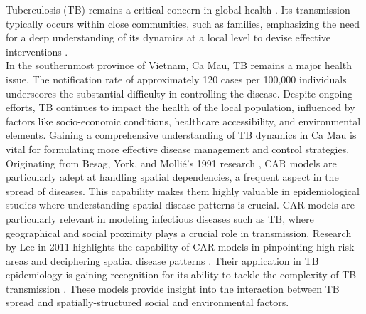 \documentclass[
  number,
  preprint,
  3p]{elsarticle}
\begin{document}
Tuberculosis (TB) remains a critical concern in global health
\citep{villar-hernandez-2023}. Its transmission typically occurs within
close communities, such as families, emphasizing the need for a deep
understanding of its dynamics at a local level to devise effective
interventions \citep{cole-2020}.\\
In the southernmost province of Vietnam, Ca Mau, TB remains a major
health issue. The notification rate of approximately 120 cases per
100,000 individuals underscores the substantial difficulty in
controlling the disease. Despite ongoing efforts, TB continues to impact
the health of the local population, influenced by factors like
socio-economic conditions, healthcare accessibility, and environmental
elements. Gaining a comprehensive understanding of TB dynamics in Ca Mau
is vital for formulating more effective disease management and control
strategies.\\
Originating from Besag, York, and Mollié's 1991 research
\citep{besag-1991}, CAR models are particularly adept at handling
spatial dependencies, a frequent aspect in the spread of diseases. This
capability makes them highly valuable in epidemiological studies where
understanding spatial disease patterns is crucial. CAR models are
particularly relevant in modeling infectious diseases such as TB, where
geographical and social proximity plays a crucial role in transmission.
Research by Lee in 2011 highlights the capability of CAR models in
pinpointing high-risk areas and deciphering spatial disease patterns
\citep{lee-2011}. Their application in TB epidemiology is gaining
recognition for its ability to tackle the complexity of TB transmission
\citep{lima-2019}. These models provide insight into the interaction
between TB spread and spatially-structured social and environmental
factors.
\end{document}
